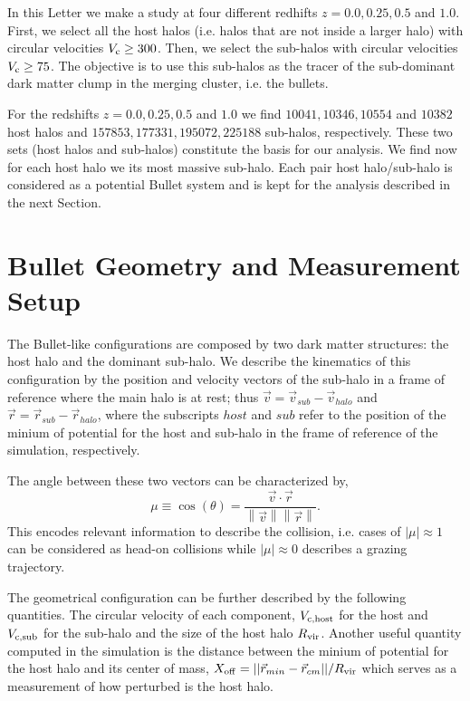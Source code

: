 \documentclass{emulateapj}
\newcommand{\kms}{{\ifmmode{{\mathrm{\,km\ s}^{-1}}}\else{\,km~s$^{-1}$}\fi}}
\begin{document}
In this Letter we make a study at four different redhifts $z=0.0,0.25,
0.5$ and $1.0$. First, we select all the host halos (i.e. halos that
are not inside a larger halo) with circular velocities $V_{\rm c}\geq
300$\kms. Then, we select the sub-halos with circular velocities
$V_{\rm c}\geq 75$\kms. The objective is to use this sub-halos as the
tracer of the sub-dominant dark matter clump in the merging cluster,
i.e. the bullets.

For the redshifts $z=0.0,0.25, 0.5$ and $1.0$ we find $10041, 10346,
10554$ and $10382$ host halos and $157853, 177331, 195072, 225188$
sub-halos, respectively. These two sets (host halos and sub-halos)
constitute the basis for our analysis. We find now for each host halo
we its most massive sub-halo. Each pair host halo/sub-halo is
considered as a potential Bullet system and is kept for the analysis
described in the next Section.  

\section{Bullet Geometry and Measurement Setup}
\label{sec:setup}

The Bullet-like configurations are composed by two dark matter
structures: the host halo and the dominant sub-halo. We describe the
kinematics of this configuration by the 
position and velocity vectors of the sub-halo in a frame of reference
where the main halo is at rest; thus
$\vec{v{}}=\vec{v}_{sub}-\vec{v}_{halo}$ and
$\vec{r}=\vec{r}_{sub}-\vec{r}_{halo}$, where the subscripts $host$
and $sub$ refer to the position of the minium of potential for the
host and sub-halo in the frame of reference of the simulation,
respectively.  

The angle between these two vectors can be characterized by, 
\begin{equation}
  \mu\equiv
  \cos(\theta)=\frac{\vec{v{}}\cdotp{}\vec{r}}{\left\|\vec{v}{}\right\|
    \left\|\vec{r}\right\|} .
 \end{equation} 
%
This encodes relevant information to describe the collision,
i.e. cases of $|\mu|\approx 1$ can be considered as head-on collisions
while $|\mu|\approx 0$ describes a grazing trajectory.

The geometrical configuration can be further described by the
following quantities. The circular velocity of each component, $V_{\rm
  c,host}$ for the host and $V_{\rm c, sub}$ for the sub-halo and the
size of the host halo $R_{\rm vir}$. Another useful quantity computed
in the simulation is the distance between the minium of potential for
the host halo and its center of mass, $X_{\rm
  off}=||\vec{r}_{min}-\vec{r}_{cm}||/R_{\rm vir}$ which serves as a
measurement of how perturbed is the host halo.
\end{document}
